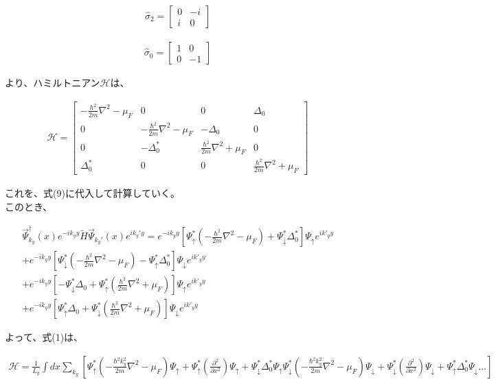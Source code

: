 \documentclass{jsarticle}
\begin{document}
		\begin{align}
			\hat{\sigma}_2=
			\begin{bmatrix}
				0 & -i \\ 
				i & 0
			\end{bmatrix}
		\end{align}
		
		\begin{align}
			\hat{\sigma}_0=
			\begin{bmatrix}
				1 & 0 \\ 
				0 & -1
			\end{bmatrix}  
		\end{align}
		
		より、ハミルトニアン$\mathcal{H}$は、
		
		\begin{align}
			\mathcal{H}=
			\begin{bmatrix}
				-\frac{\hbar^2}{2m}\nabla^2-\mu_F & 0 & 0 & \Delta_0 \\ 
				0 & -\frac{\hbar^2}{2m}\nabla^2-\mu_F & -\Delta_0 & 0 \\ 
				0 & -\Delta_0^\ast & \frac{\hbar^2}{2m}\nabla^2+\mu_F & 0 \\ 
				\Delta_0^\ast & 0 & 0 & \frac{\hbar^2}{2m}\nabla^2+\mu_F
			\end{bmatrix} 
		\end{align}
		
		これを、式(9)に代入して計算していく。　\\
		このとき、
		
		\begin{align*}
			\vec{\Psi}_{k_y}^\dagger(x) e^{-ik_yy} \tilde{H}  \vec{\Psi}_{k_y'}(x) e^{ik_y'y} = 
			e^{-ik_yy} \left[ \Psi_\uparrow^\ast \left( -\frac{\hbar^2}{2m}\nabla^2-\mu_F \right) +\Psi_\downarrow^\ast \Delta_0^\ast \right] \Psi_\uparrow e^{ik'_yy} \\
			+e^{-ik_yy} \left[ \Psi_\downarrow^\ast \left( -\frac{\hbar^2}{2m}\nabla^2-\mu_F \right) -\Psi_\uparrow^\ast \Delta_0^\ast \right] \Psi_\downarrow e^{ik'_yy} \\
			+ e^{-ik_yy} \left[ -\Psi_\downarrow^\ast\Delta_0 +\Psi_\uparrow^\ast \left( \frac{\hbar^2}{2m}\nabla^2+\mu_F \right) \right] \Psi_\uparrow e^{ik'_yy} \\
			+e^{-ik_yy} \left[ \Psi_\uparrow^\ast\Delta_0 +\Psi_\downarrow^\ast \left( \frac{\hbar^2}{2m}\nabla^2+\mu_F \right) \right] \Psi_\downarrow e^{ik'_yy}
		\end{align*}
		
		よって、式(1)は、
		
		\begin{align*}
			\mathcal{H}= \frac{1}{L_y}\int dx \sum_{k_y}
			\left[ \Psi_\uparrow^\ast \left( -\frac{\hbar^2k_y^2}{2m}\nabla^2-\mu_F \right)\Psi_\uparrow
			+\Psi_\uparrow^\ast \left( \frac{\partial^2}{\partial x^2}\right)\Psi_\uparrow
			+\Psi_\downarrow^\ast \Delta_0^\ast \Psi_\uparrow 
			\Psi_\downarrow^\ast \left( -\frac{\hbar^2k_y^2}{2m}\nabla^2-\mu_F \right)\Psi_\downarrow
			+\Psi_\downarrow^\ast \left( \frac{\partial^2}{\partial x^2} \right) \Psi_\downarrow
			+\Psi_\uparrow^\ast \Delta_0^\ast \Psi_\downarrow ...
			\right] 
		\end{align*}
		
		
\end{document}

